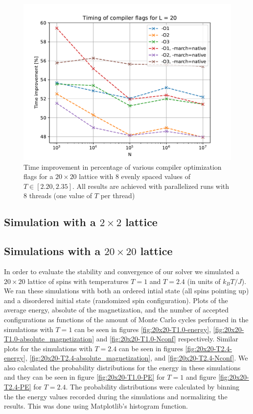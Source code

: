 \documentclass[reprint,english,notitlepage]{revtex4-1}  %
\begin{document}
\begin{figure}[H]
	\centering
	\includegraphics[width=\columnwidth]{../data/benchmark.pdf}
	\caption{Time improvement in percentage of various compiler optimization flags for a \(20\times 20\) lattice with \(8\) evenly spaced values of \(T \in [2.20, 2.35]\). All results are achieved with parallelized runs with \(8\) threads (one value of \(T\) per thread)} \label{fig:benchmark_compiler_flags}
\end{figure}



\subsection{Simulation with a $2\times 2$ lattice} \label{sec:IV:B}


\subsection{Simulations with a $20 \times 20$ lattice} \label{sec:IV:C}

In order to evaluate the stability and convergence of our solver we simulated a $20 \times 20$ lattice of spins with temperatures $T = 1$ and $T = 2.4$ (in units of $k_B T/J$). We ran these simulations with both an ordered intial state (all spins pointing up) and a disordered initial state (randomized spin configuration). Plots of the average energy, absolute of the magnetization, and the number of accepted configurations as functions of the amount of Monte Carlo cycles performed in the simulations with $T=1$ can be seen in figures \ref{fig:20x20-T1.0-energy}, \ref{fig:20x20-T1.0-absolute_magnetization} and \ref{fig:20x20-T1.0-Nconf} respectively. Similar plots for the simulations with $T=2.4$ can be seen in figures \ref{fig:20x20-T2.4-energy}, \ref{fig:20x20-T2.4-absolute_magnetization}, and \ref{fig:20x20-T2.4-Nconf}. We also calculated the probability distributions for the energy in these simulations and they can be seen in figure \ref{fig:20x20-T1.0-PE} for $T=1$ and figure \ref{fig:20x20-T2.4-PE} for $T=2.4$. The probability distributions were calculated by binning the the energy values recorded during the simulations and normalizing the results. This was done using Matplotlib's histogram function.
\end{document}
